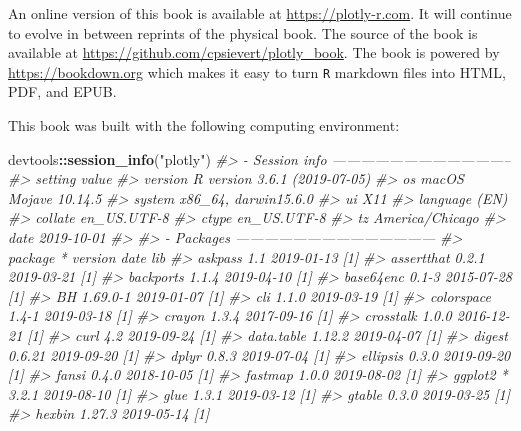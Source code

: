 \documentclass[
  12pt,
]{krantz}
\newenvironment{Shaded}{\begin{snugshade}}{\end{snugshade}}
\newcommand{\CommentTok}[1]{\textcolor[rgb]{0.56,0.35,0.01}{\textit{#1}}}
\newcommand{\KeywordTok}[1]{\textcolor[rgb]{0.13,0.29,0.53}{\textbf{#1}}}
\newcommand{\NormalTok}[1]{#1}
\newcommand{\OperatorTok}[1]{\textcolor[rgb]{0.81,0.36,0.00}{\textbf{#1}}}
\newcommand{\StringTok}[1]{\textcolor[rgb]{0.31,0.60,0.02}{#1}}
\begin{document}
An online version of this book is available at \url{https://plotly-r.com}. It will continue to evolve in between reprints of the physical book. The source of the book is available at \url{https://github.com/cpsievert/plotly_book}. The book is powered by \url{https://bookdown.org} which makes it easy to turn \texttt{R} markdown files into HTML, PDF, and EPUB.

This book was built with the following computing environment:

\begin{Shaded}
\begin{Highlighting}[]
\NormalTok{devtools}\OperatorTok{::}\KeywordTok{session_info}\NormalTok{(}\StringTok{"plotly"}\NormalTok{)}
\CommentTok{#> - Session info --------------------------------------}
\CommentTok{#>  setting  value                       }
\CommentTok{#>  version  R version 3.6.1 (2019-07-05)}
\CommentTok{#>  os       macOS Mojave 10.14.5        }
\CommentTok{#>  system   x86_64, darwin15.6.0        }
\CommentTok{#>  ui       X11                         }
\CommentTok{#>  language (EN)                        }
\CommentTok{#>  collate  en_US.UTF-8                 }
\CommentTok{#>  ctype    en_US.UTF-8                 }
\CommentTok{#>  tz       America/Chicago             }
\CommentTok{#>  date     2019-10-01                  }
\CommentTok{#> }
\CommentTok{#> - Packages ------------------------------------------}
\CommentTok{#>  package      * version    date       lib}
\CommentTok{#>  askpass        1.1        2019-01-13 [1]}
\CommentTok{#>  assertthat     0.2.1      2019-03-21 [1]}
\CommentTok{#>  backports      1.1.4      2019-04-10 [1]}
\CommentTok{#>  base64enc      0.1-3      2015-07-28 [1]}
\CommentTok{#>  BH             1.69.0-1   2019-01-07 [1]}
\CommentTok{#>  cli            1.1.0      2019-03-19 [1]}
\CommentTok{#>  colorspace     1.4-1      2019-03-18 [1]}
\CommentTok{#>  crayon         1.3.4      2017-09-16 [1]}
\CommentTok{#>  crosstalk      1.0.0      2016-12-21 [1]}
\CommentTok{#>  curl           4.2        2019-09-24 [1]}
\CommentTok{#>  data.table     1.12.2     2019-04-07 [1]}
\CommentTok{#>  digest         0.6.21     2019-09-20 [1]}
\CommentTok{#>  dplyr          0.8.3      2019-07-04 [1]}
\CommentTok{#>  ellipsis       0.3.0      2019-09-20 [1]}
\CommentTok{#>  fansi          0.4.0      2018-10-05 [1]}
\CommentTok{#>  fastmap        1.0.0      2019-08-02 [1]}
\CommentTok{#>  ggplot2      * 3.2.1      2019-08-10 [1]}
\CommentTok{#>  glue           1.3.1      2019-03-12 [1]}
\CommentTok{#>  gtable         0.3.0      2019-03-25 [1]}
\CommentTok{#>  hexbin         1.27.3     2019-05-14 [1]}

\end{Highlighting}
\end{Shaded}
\end{document}
